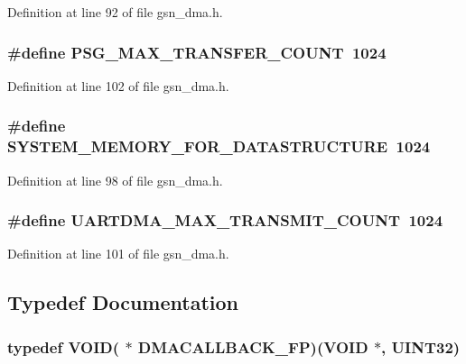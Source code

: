 Definition at line 92 of file gsn\_\-dma.h.

\hypertarget{a00484_ac8c5aeb4ff04ea6017a636ace0320dbb}{
\subsubsection[{PSG\_\-MAX\_\-TRANSFER\_\-COUNT}]{\setlength{\rightskip}{0pt plus 5cm}\#define PSG\_\-MAX\_\-TRANSFER\_\-COUNT~1024}}
\label{a00484_ac8c5aeb4ff04ea6017a636ace0320dbb}


Definition at line 102 of file gsn\_\-dma.h.

\hypertarget{a00484_ae78fa6fe29ddd383c2c6ca1b9490130d}{
\subsubsection[{SYSTEM\_\-MEMORY\_\-FOR\_\-DATASTRUCTURE}]{\setlength{\rightskip}{0pt plus 5cm}\#define SYSTEM\_\-MEMORY\_\-FOR\_\-DATASTRUCTURE~1024}}
\label{a00484_ae78fa6fe29ddd383c2c6ca1b9490130d}


Definition at line 98 of file gsn\_\-dma.h.

\hypertarget{a00484_abcdb10dc038da3a0c6aa8af1d933f67b}{
\subsubsection[{UARTDMA\_\-MAX\_\-TRANSMIT\_\-COUNT}]{\setlength{\rightskip}{0pt plus 5cm}\#define UARTDMA\_\-MAX\_\-TRANSMIT\_\-COUNT~1024}}
\label{a00484_abcdb10dc038da3a0c6aa8af1d933f67b}


Definition at line 101 of file gsn\_\-dma.h.



\subsection{Typedef Documentation}
\hypertarget{a00484_a74d23c3cb3acf00134600795aef55b6e}{
\subsubsection[{DMACALLBACK\_\-FP}]{\setlength{\rightskip}{0pt plus 5cm}typedef VOID( $\ast$ {\bf DMACALLBACK\_\-FP})(VOID $\ast$, {\bf UINT32})}}
\label{a00484_a74d23c3cb3acf00134600795aef55b6e}


